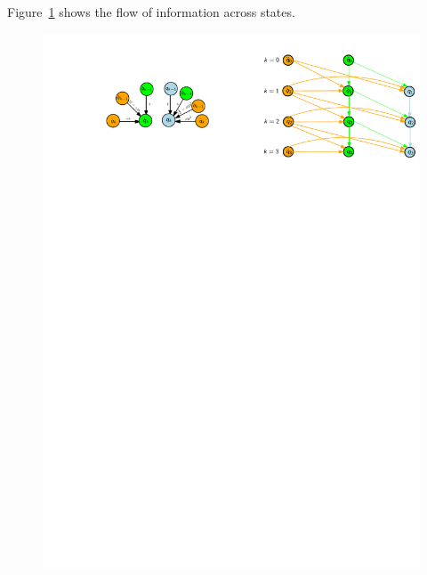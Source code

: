 \documentclass{beamer}
\begin{document}
\begin{frame}[allowframebreaks]
{    Figure~\ref{fig:nbg-illustration} shows the flow of information across
    states.
    \begin{figure}
      \centering
      \includegraphics[width=\textwidth]{nbg-chart.pdf}
      \label{fig:nbg-illustration}
    \end{figure}

}
\end{frame}
\end{document}
